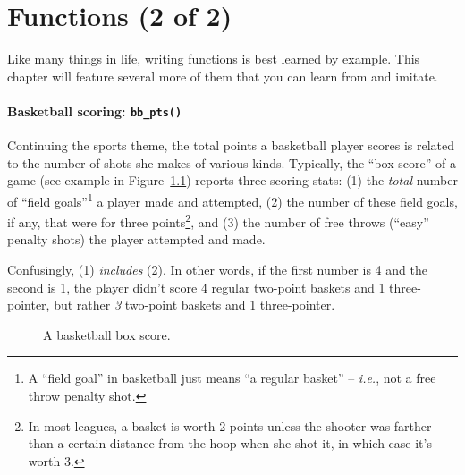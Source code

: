 
\chapter{Functions (2 of 2)}

Like many things in life, writing functions is best learned by example. This
chapter will feature several more of them that you can learn from and imitate.

\subsubsection{Basketball scoring: \texttt{bb\_pts()}}

Continuing the sports theme, the total points a basketball player scores is
related to the number of shots she makes of various kinds. Typically, the ``box
score'' of a game (see example in Figure~\ref{boxScore}) reports three scoring
stats: (1) the \textit{total} number of ``field goals''\footnote{A ``field
goal'' in basketball just means ``a regular basket'' -- \textit{i.e.}, not a
free throw penalty shot.} a player made and attempted, (2) the number of these
field goals, if any, that were for three points\footnote{In most leagues, a
basket is worth 2 points unless the shooter was farther than a certain distance
from the hoop when she shot it, in which case it's worth 3.}, and (3) the
number of free throws (``easy'' penalty shots) the player attempted and made.

Confusingly, (1) \textit{includes} (2). In other words, if the first number is
4 and the second is 1, the player didn't score 4 regular two-point baskets and
1 three-pointer, but rather \textit{3} two-point baskets and 1 three-pointer.

\begin{figure}[ht]
\centering
{}
\medskip
\caption{A basketball box score.}
\label{boxScore}
\end{figure}

